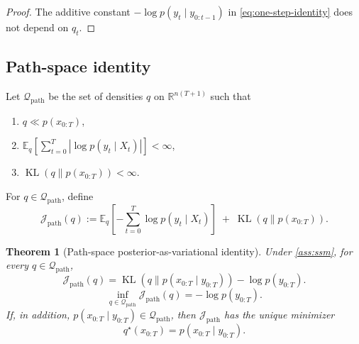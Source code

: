 \documentclass[11pt]{article}
\newcommand{\R}{\mathbb{R}}
\newcommand{\E}{\mathbb{E}}
\newcommand{\KL}{\operatorname{KL}}
\newcommand{\xtraj}{x_{0:T}}
\newcommand{\ytraj}{y_{0:T}}
\newcommand{\abs}[1]{\left\lvert #1 \right\rvert}
\newcommand{\bracks}[1]{\left[ #1 \right]}
\newcommand{\mc}{\mathcal}
\numberwithin{equation}{section}
\theoremstyle{plain}
\newtheorem{theorem}{Theorem}[section]
\theoremstyle{definition}
\theoremstyle{remark}
\begin{document}
\begin{proof}
The additive constant $-\log p(y_t\mid y_{0:t-1})$ in \cref{eq:one-step-identity} does not depend on $q_t$.
\end{proof}

\subsection{Path-space identity}

Let $\mc Q_{\mathrm{path}}$ be the set of densities $q$ on $\R^{n(T+1)}$ such that
\begin{enumerate}[label=\roman*.]
\item $q\ll p(\xtraj)$,
\item $\E_q\!\bracks{\sum_{t=0}^{T}\abs{\log p(y_t\mid X_t)}}<\infty$,
\item $\KL(q\|p(\xtraj))<\infty$.
\end{enumerate}
For $q\in\mc Q_{\mathrm{path}}$, define
\begin{equation}
\mc J_{\mathrm{path}}(q)
:=
\E_q\!\bracks{-\sum_{t=0}^{T}\log p(y_t\mid X_t)}
\;+\;
\KL(q\|p(\xtraj)).
\label{eq:path-functional}
\end{equation}

\begin{theorem}[Path-space posterior-as-variational identity]
\label{thm:path-variational}
Under \cref{ass:ssm}, for every $q\in\mc Q_{\mathrm{path}}$,
\begin{equation}
\mc J_{\mathrm{path}}(q)
=
\KL(q\|p(\xtraj\mid \ytraj))-\log p(\ytraj).
\label{eq:path-identity}
\end{equation}
\begin{equation}
\inf_{q\in\mc Q_{\mathrm{path}}}\mc J_{\mathrm{path}}(q)
=
-\log p(\ytraj).
\label{eq:path-infimum}
\end{equation}
If, in addition, $p(\xtraj\mid \ytraj)\in\mc Q_{\mathrm{path}}$, then $\mc J_{\mathrm{path}}$ has the unique minimizer
\begin{equation}
q^\star(\xtraj) = p(\xtraj\mid \ytraj).
\end{equation}
\end{theorem}
\end{document}
